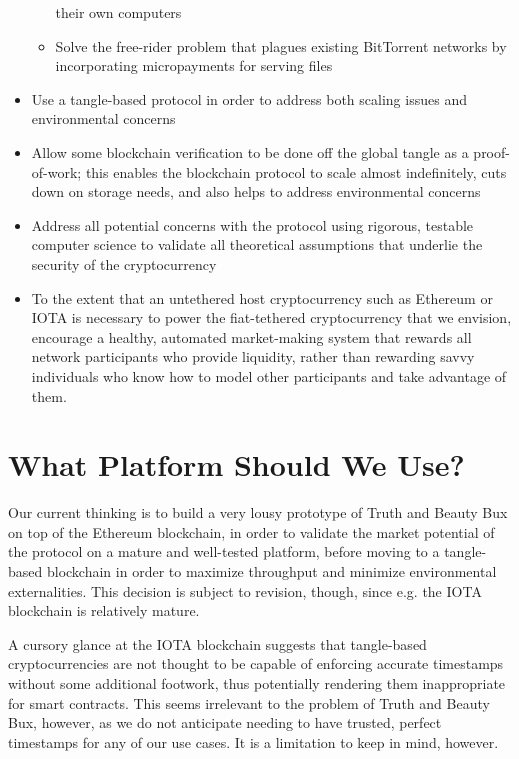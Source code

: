 \documentclass{article}
\begin{document}
\begin{itemize}
\begin{itemize}
      their own computers
    \item Solve the free-rider problem that plagues existing
      BitTorrent networks by incorporating micropayments for serving
      files
  \end{itemize}
\item Use a tangle-based protocol in order to address both scaling
  issues and environmental concerns
\item Allow some blockchain verification to be done off the global
  tangle as a proof-of-work; this enables the blockchain protocol to
  scale almost indefinitely, cuts down on storage needs, and also
  helps to address environmental concerns
\item Address all potential concerns with the protocol using rigorous,
  testable computer science to validate all theoretical assumptions
  that underlie the security of the cryptocurrency
\item To the extent that an untethered host cryptocurrency such as
  Ethereum or IOTA is necessary to power the fiat-tethered
  cryptocurrency that we envision, encourage a healthy, automated
  market-making system that rewards all network participants who
  provide liquidity, rather than rewarding savvy individuals who know
  how to model other participants and take advantage of them.
\end{itemize}

\section{What Platform Should We Use?}

Our current thinking is to build a very lousy prototype of Truth and
Beauty Bux on top of the Ethereum blockchain, in order to validate the
market potential of the protocol on a mature and well-tested platform,
before moving to a tangle-based blockchain in order to maximize
throughput and minimize environmental externalities. This decision is
subject to revision, though, since e.g. the IOTA blockchain is
relatively mature.

A cursory glance at the IOTA blockchain suggests that tangle-based
cryptocurrencies are not thought to be capable of enforcing accurate
timestamps without some additional footwork, thus potentially
rendering them inappropriate for smart contracts. This seems
irrelevant to the problem of Truth and Beauty Bux, however, as we do
not anticipate needing to have trusted, perfect timestamps for any of
our use cases. It is a limitation to keep in mind, however.
\end{document}
